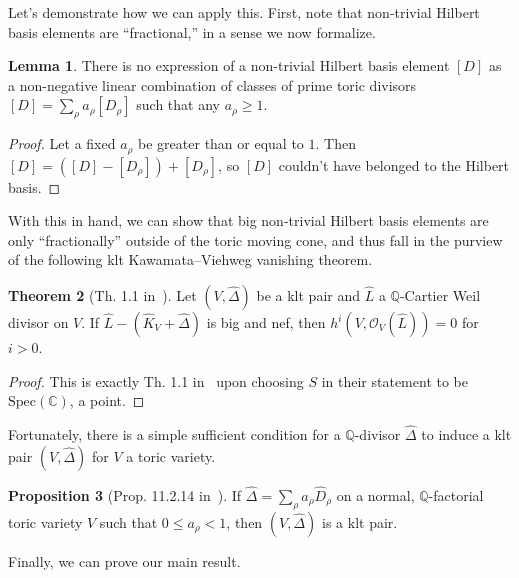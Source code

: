 \documentclass[11pt,dvipsnames]{article}
\theoremstyle{definition}
\newtheorem{theorem}{Theorem}
\newtheorem{prop}[theorem]{Proposition}
\newtheorem{lem}[theorem]{Lemma}
\begin{document}
Let's demonstrate how we can apply this. First, note that non-trivial Hilbert basis elements are ``fractional,'' in a sense we now formalize. 
\begin{lem}
    \label{lem:fraction_coefs_nontrivial_hilb}
    There is no expression of a non-trivial Hilbert basis element $[D]$ as a non-negative linear combination of classes of prime toric divisors $[D] = \sum_\rho a_\rho [D_\rho]$ such that any $a_\rho \geq 1$. 
\end{lem}
\begin{proof}
    Let a fixed $a_\rho$ be greater than or equal to $1$. Then $[D] = ([D] - [D_\rho]) + [D_\rho]$, so $[D]$ couldn't have belonged to the Hilbert basis.
\end{proof}
With this in hand, we can show that big non-trivial Hilbert basis elements are only ``fractionally'' outside of the toric moving cone, and thus fall in the purview of the following klt Kawamata--Viehweg vanishing theorem. 
\begin{theorem}[Th. 1.1 in~\cite{tanakakawamata}]
    Let $(V,\hat{\Delta})$ be a klt pair and $\hat{L}$ a $\mathbb{Q}$-Cartier Weil divisor on $V$. If $\hat{L} - (\hat{K}_V + \hat{\Delta})$ is big and nef, then $h^i(V,\mathcal{O}_V(\hat{L})) = 0$ for $i > 0$.
    \label{th:klt_kv}
\end{theorem}
\begin{proof}
    This is exactly Th. 1.1 in~\cite{tanakakawamata} upon choosing $S$ in their statement to be $\mathrm{Spec}(\mathbb{C})$, a point.
\end{proof}
Fortunately, there is a simple sufficient condition for a $\mathbb{Q}$-divisor $\hat{\Delta}$ to induce a klt pair $(V,\hat{\Delta})$ for $V$ a toric variety.
\begin{prop}[Prop. 11.2.14 in~\cite{cls}]
    If $\hat{\Delta} = \sum_\rho a_\rho \hat{D}_\rho$ on a normal, $\mathbb{Q}$-factorial toric variety $V$ such that $0 \leq a_\rho < 1$, then $(V,\hat{\Delta})$ is a klt pair.
    \label{prop:toric_klt}
\end{prop}
Finally, we can prove our main result.
\end{document}
